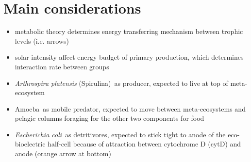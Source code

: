 \documentclass[a4paper,11pt]{article}
\newcommand{\ec}{\textit{Escherichia coli}}
\newcommand{\am}{Amoeba}
\newcommand{\ap}{\textit{Arthrospira platensis} (Spirulina)}
\begin{document}
    \section{Main considerations}
    \begin{itemize}
        \item metabolic theory determines energy transferring mechanism between trophic levels (i.e. arrows)
        \item solar intensity affect energy budget of primary production, which determines interaction rate between groups
        \item \ap\ as producer, expected to live at top of meta-ecosystem
        \item \am\ as mobile predator, expected to move between meta-ecosystems and pelagic columns foraging for the other two components for food
        \item \ec\ as detritivores, expected to stick tight to anode of the eco-bioelectric half-cell because of attraction between cytochrome D (cytD) and anode (orange arrow at bottom)
    \end{itemize}
    
\end{document}
